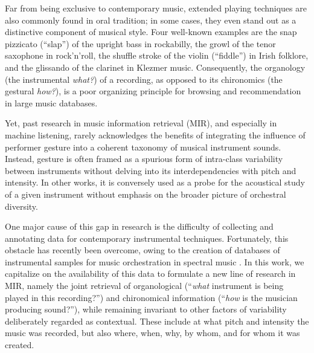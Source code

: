 Far from being exclusive to contemporary music, extended playing techniques are also commonly found in oral tradition; in some cases, they even stand out as a distinctive component of musical style.
Four well-known examples are
the snap pizzicato (``slap'') of the upright bass in rockabilly,
the growl of the tenor saxophone in rock'n'roll,
the shuffle stroke of the violin (``fiddle'') in Irish folklore,
and the glissando of the clarinet in Klezmer music.
Consequently, the organology (the instrumental \emph{what?}) of a recording, as opposed to its chironomics (the gestural \emph{how?}), is a poor organizing principle for browsing and recommendation in large music databases.

Yet, past research in music information retrieval (MIR), and especially in machine listening, rarely acknowledges the benefits of integrating the influence of performer gesture into a coherent taxonomy of musical instrument sounds.
Instead, gesture is often framed as a spurious form of intra-class variability between instruments without delving into its interdependencies with pitch and intensity.
In other works, it is conversely used as a probe for the acoustical study of a given instrument without emphasis on the broader picture of orchestral diversity.

One major cause of this gap in research is the difficulty of collecting and annotating data for contemporary instrumental techniques.
Fortunately, this obstacle has recently been overcome, owing to the creation of databases of instrumental samples for music orchestration in spectral music \cite{maresz2013cmr}.
In this work, we capitalize on the availability of this data to formulate a new line of research in MIR, namely the joint retrieval of organological (``\emph{what} instrument is being played in this recording?'') and chironomical information (``\emph{how} is the musician producing sound?''), while remaining invariant to other factors of variability deliberately regarded as contextual.
These include at what pitch and intensity the music was recorded, but also where, when, why, by whom, and for whom it was created.

